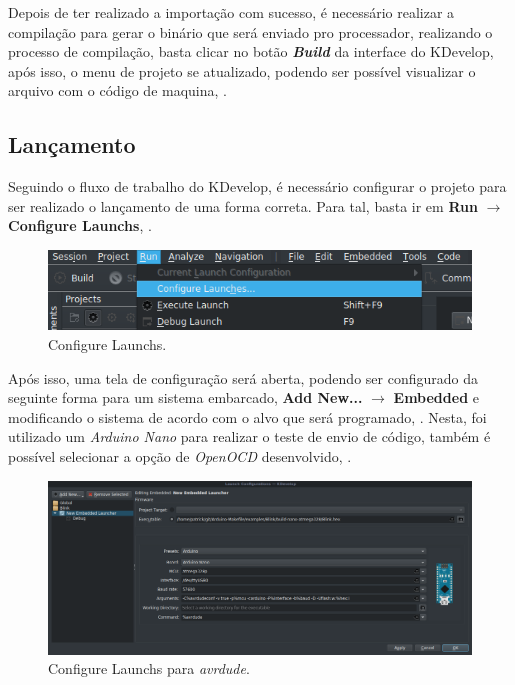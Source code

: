 \begin{figure}[!htb]
\begin{minipage}[t]{0.5\textwidth}
  \label{fig:projects2}
  \end{minipage}
\end{figure}

Depois de ter realizado a importação com sucesso, é necessário realizar a compilação para gerar o binário que será enviado pro processador, realizando o processo de compilação, basta clicar no botão \textbf{\textit{Build}} da interface do KDevelop, após isso, o menu de projeto se atualizado, podendo ser possível visualizar o arquivo com o código de maquina, .

\subsection{Lançamento}

Seguindo o fluxo de trabalho do KDevelop, é necessário configurar o projeto para ser realizado o lançamento de uma forma correta. Para tal, basta ir em \textbf{Run} $\rightarrow$ \textbf{Configure Launchs}, .

\begin{figure}[!htb]
  \centering
  \caption[Configure Launchs]{Configure Launchs.}
  \label{fig:run}
  \includegraphics[width=1\textwidth]{figuras/run.png}
\end{figure}

Após isso, uma tela de configuração será aberta, podendo ser configurado da seguinte forma para um sistema embarcado, \textbf{Add New...} $\rightarrow$ \textbf{Embedded} e modificando o sistema de acordo com o alvo que será programado, . Nesta, foi utilizado um \textit{Arduino Nano} para realizar o teste de envio de código, também é possível selecionar a opção de \textit{OpenOCD} desenvolvido, .

\begin{figure}[!htb]
  \centering
  \caption[\textit{Configure Launchs} para \textit{avrdude}]{Configure Launchs para \textit{avrdude}.}
  \label{fig:run2}
  \includegraphics[width=1\textwidth]{figuras/run2.png}
\end{figure}

